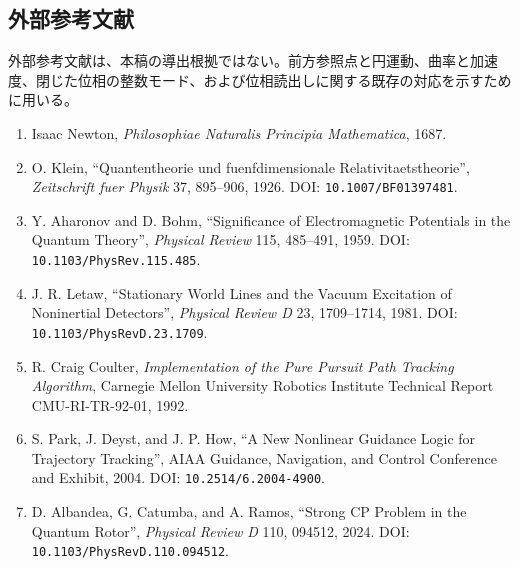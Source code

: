 \documentclass[
  10pt,
  a4paper,
]{ltjsarticle}
\providecommand{\tightlist}{%
  \setlength{\itemsep}{0pt}\setlength{\parskip}{0pt}}
\begin{document}
\subsection{外部参考文献}\label{ux5916ux90e8ux53c2ux8003ux6587ux732e}

外部参考文献は、本稿の導出根拠ではない。前方参照点と円運動、曲率と加速度、閉じた位相の整数モード、および位相読出しに関する既存の対応を示すために用いる。

\begin{enumerate}
\def\labelenumi{\arabic{enumi}.}
\setcounter{enumi}{5}
\tightlist
\item
  Isaac Newton, \emph{Philosophiae Naturalis Principia Mathematica},
  1687.
\item
  O. Klein, ``Quantentheorie und fuenfdimensionale
  Relativitaetstheorie'', \emph{Zeitschrift fuer Physik} 37, 895--906,
  1926. DOI: \texttt{10.1007/BF01397481}.
\item
  Y. Aharonov and D. Bohm, ``Significance of Electromagnetic Potentials
  in the Quantum Theory'', \emph{Physical Review} 115, 485--491, 1959.
  DOI: \texttt{10.1103/PhysRev.115.485}.
\item
  J. R. Letaw, ``Stationary World Lines and the Vacuum Excitation of
  Noninertial Detectors'', \emph{Physical Review D} 23, 1709--1714,
  1981. DOI: \texttt{10.1103/PhysRevD.23.1709}.
\item
  R. Craig Coulter, \emph{Implementation of the Pure Pursuit Path
  Tracking Algorithm}, Carnegie Mellon University Robotics Institute
  Technical Report CMU-RI-TR-92-01, 1992.
\item
  S. Park, J. Deyst, and J. P. How, ``A New Nonlinear Guidance Logic for
  Trajectory Tracking'', AIAA Guidance, Navigation, and Control
  Conference and Exhibit, 2004. DOI: \texttt{10.2514/6.2004-4900}.
\item
  D. Albandea, G. Catumba, and A. Ramos, ``Strong CP Problem in the
  Quantum Rotor'', \emph{Physical Review D} 110, 094512, 2024. DOI:
  \texttt{10.1103/PhysRevD.110.094512}.
\end{enumerate}
\end{document}
